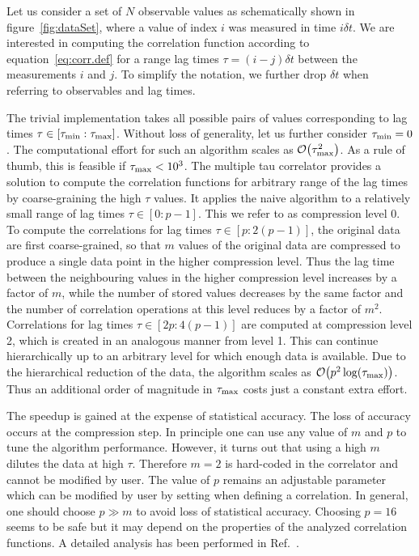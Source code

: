 Let us consider a set of $N$ observable values as schematically shown
in figure~\ref{fig:dataSet}, where a value of index $i$ was measured
in time $i\delta t$. We are interested in computing the correlation 
function according to equation~\eqref{eq:corr.def} for a range lag times
$\tau = (i-j)\delta t$ between the measurements $i$ and $j$.
To simplify the notation, we further drop $\delta t$
when referring to observables and lag times. 

The trivial implementation takes all possible pairs of values
corresponding to lag times $\tau \in [\tau_{\mathrm{min}}:\tau_{\mathrm{max}}]$. 
Without loss of generality, let us further consider $\tau_{\mathrm{min}}=0$.
The computational effort for such an algorithm scales
as ${\cal O} \bigl(\tau_{\mathrm{max}}^2\bigr)$.
As a rule of thumb, this is feasible if $\tau_{\mathrm{max}} < 10^3$.
The multiple tau correlator provides a solution to compute the
correlation functions for arbitrary range of the lag times by
coarse-graining the high $\tau$ values. It applies the naive algorithm
to a relatively small range of lag times $\tau \in [0:p-1]$. This we refer
to as compression level 0. To compute the correlations for lag times
$\tau \in [p:2(p-1)]$, the original data are first coarse-grained, so
that $m$ values of the original data are compressed to produce a single
data point in the higher compression level. Thus the lag time between
the neighbouring values in the higher compression level increases
by a factor of $m$, while the number of stored values decreases by
the same factor and the number of correlation operations at this level
reduces by a factor of $m^2$. Correlations for lag times 
$\tau \in [2p:4(p-1)]$ are computed at compression level 2, which is created
in an analogous manner from level 1. This can continue hierarchically
up to an arbitrary level for which enough data is available. Due to the
hierarchical reduction of the data, the algorithm scales as 
${\cal O} \bigl( p^2 \log(\tau_{\mathrm{max}}) \bigr)$. Thus an additional order
of magnitude in $\tau_{\mathrm{max}}$ costs just a constant extra effort.

The speedup is gained at the expense of statistical accuracy.
The loss of accuracy occurs at the compression step.
In principle one can use any value of $m$ and $p$ to tune the algorithm
performance. However, it turns out that using a high $m$ dilutes the
data at high $\tau$. Therefore $m=2$ is hard-coded in the \es correlator
and cannot be modified by user. The value of $p$ remains an adjustable
parameter which can be modified by user by setting 
when defining a correlation. In general, one should choose $p \gg m$
to avoid loss of statistical accuracy. Choosing $p=16$ seems to be
safe but it may depend on the properties of the analyzed
correlation functions. A detailed analysis has been performed
in Ref.~\cite{ramirez10a}.

